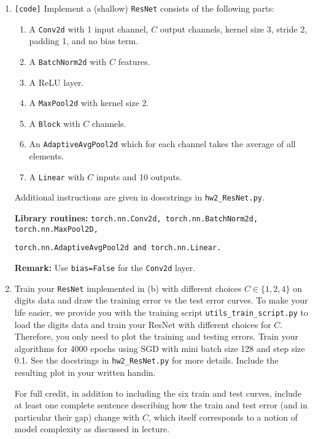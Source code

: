 \begin{Q}
\begin{enumerate}
        \item \texttt{[code]}  Implement a (shallow) \texttt{ResNet} consists of the following parts:
        \begin{enumerate}
            \item A \texttt{Conv2d} with 1 input channel, $C$ output channels, kernel size 3, stride 2, padding 1, and no bias term.
            \item A \texttt{BatchNorm2d} with $C$ features.
            \item A ReLU layer.
            \item A \texttt{MaxPool2d} with kernel size 2.
            \item A \texttt{Block} with $C$ channels.
            \item An \texttt{AdaptiveAvgPool2d} which for each channel takes the average of all elements.
            \item A \texttt{Linear} with $C$ inputs and 10 outputs.
        \end{enumerate}
        Additional instructions are given in doscstrings in \texttt{hw2\_ResNet.py}.
        
        \textbf{Library routines:} \texttt{torch.nn.Conv2d, torch.nn.BatchNorm2d, torch.nn.MaxPool2D,}
        
        \texttt{torch.nn.AdaptiveAvgPool2d and torch.nn.Linear.}
        
        \textbf{Remark:} Use \texttt{bias=False} for the \texttt{Conv2d} layer.
        
        
        \item  Train your \texttt{ResNet} implemented in (b) with different choices $C\in\{1,2,4\}$ on digits data and draw the training error vs the test error curves. To make your life easier, we provide you with the training script \texttt{utils\_train\_script.py} to load the digits data and train your ResNet with different choices for $C$. Therefore, you only need to plot the training and testing errors. Train your algorithms for 4000 epochs using SGD with mini batch size 128 and step size 0.1. See the docstrings in \texttt{hw2\_ResNet.py} for more details.  Include the resulting plot in your written handin. 
        
          For full credit, in addition to including the six train and test curves,
          include at least one complete sentence describing how the train and test error (and in particular their gap) change with $C$, which itself corresponds to a notion of model complexity as discussed in lecture.
        

\end{enumerate}
\end{Q}
